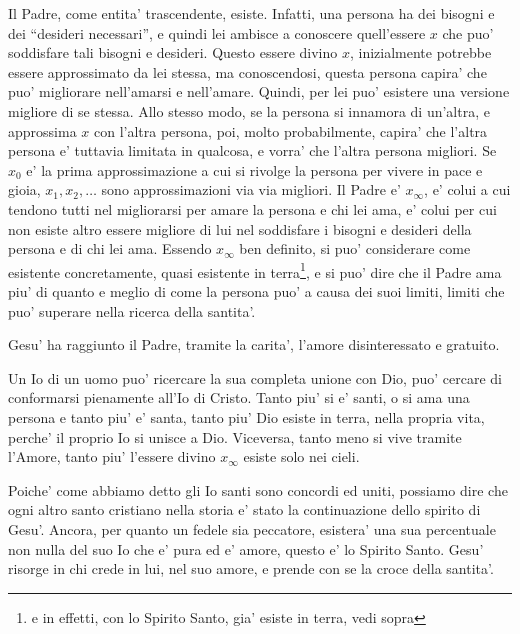 Il Padre, come entita' trascendente, esiste. Infatti, una persona ha dei bisogni e dei ``desideri necessari'', e quindi lei ambisce a conoscere quell'essere $x$ che puo' soddisfare tali bisogni e desideri. Questo essere divino $x$, inizialmente potrebbe essere approssimato da lei stessa, ma conoscendosi, questa persona capira' che puo' migliorare nell'amarsi e nell'amare. Quindi, per lei puo' esistere una versione migliore di se stessa. Allo stesso modo, se la persona si innamora di un'altra, e approssima $x$ con l'altra persona, poi, molto probabilmente, capira' che l'altra persona e' tuttavia limitata in qualcosa, e vorra' che l'altra persona migliori. Se $x_0$ e' la prima approssimazione a cui si rivolge la persona per vivere in pace e gioia, $x_1,x_2,\ldots$ sono approssimazioni via via migliori. Il Padre e' $x_{\infty}$, e' colui a cui tendono tutti nel migliorarsi per amare la persona e chi lei ama, e' colui per cui non esiste altro essere migliore di lui nel soddisfare i bisogni e desideri della persona e di chi lei ama. Essendo $x_{\infty}$ ben definito, si puo' considerare come esistente concretamente, quasi esistente in terra\footnote{e in effetti, con lo Spirito Santo, gia' esiste in terra, vedi sopra}, e si puo' dire che il Padre ama piu' di quanto e meglio di come la persona puo' a causa dei suoi limiti, limiti che puo' superare nella ricerca della santita'.

Gesu' ha raggiunto il Padre, tramite la carita',  l'amore disinteressato e gratuito.

Un Io di un uomo puo' ricercare la sua completa unione con Dio, puo' cercare di conformarsi pienamente all'Io di Cristo. 
Tanto piu' si e' santi, o si ama una persona e tanto piu' e' santa, tanto piu' Dio esiste in terra, nella propria vita, perche' il proprio Io si unisce a Dio. Viceversa, tanto meno si vive tramite l'Amore, tanto piu' l'essere divino $x_{\infty}$ esiste solo nei cieli. 

Poiche' come abbiamo detto gli Io santi sono concordi ed uniti, possiamo dire che ogni altro santo cristiano nella storia e' stato la continuazione dello spirito di Gesu'. Ancora, per quanto un fedele sia peccatore, esistera' una sua percentuale non nulla del suo Io che e' pura ed e' amore, questo e' lo Spirito Santo. Gesu' risorge in chi crede in lui, nel suo amore, e prende con se la croce della santita'.

